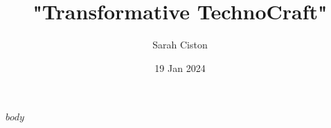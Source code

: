 \documentclass[9pt]{scrartcl}
\title{"Trans\*formative TechnoCraft"}
\author{Sarah Ciston}
\date{19 Jan 2024}
\begin{document}
\maketitle
\tableofcontents

$body$
\end{document}
